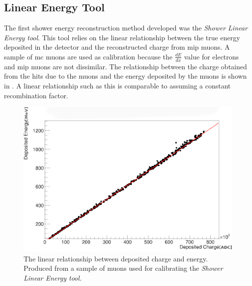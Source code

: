 \subsection{Linear Energy Tool}\label{subchap:Linear Energy Tool}
The first shower energy reconstruction method developed was the \textit{Shower Linear Energy tool}. This tool relies on the linear relationship between the true energy deposited in the detector and the reconstructed charge from \gls{mip} muons. A sample of \Gls{mc} muons are used as calibration because the $\frac{dE}{dx}$ value for electrons and \Gls{mip} muons are not dissimilar. The relationship between the charge obtained from the hits due to the muons and the energy deposited by the muons is shown in . A linear relationship such as this is comparable to assuming a constant recombination factor. 



\newpage
\begin{figure}[h]
    \centering
    \includegraphics[width = \largefigwidth]{figures-chap4/linear_energy_lookup_curve1.png}
    \caption{The linear relationship between deposited charge and energy. Produced from a sample of muons used for calibrating the \textit{Shower Linear Energy tool.}}
    \label{fig:linear lookup curve}
\end{figure}



